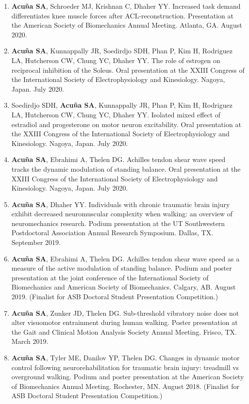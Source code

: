 \documentclass[letterpaper, 10pt]{article}
\begin{document}
\begin{enumerate}
    \item \textbf{Acuña SA}, Schroeder MJ, Krishnan C, Dhaher YY. Increased task demand differentiates knee muscle forces after ACL-reconstruction. Presentation at the American Society of Biomechanics Annual Meeting. Atlanta, GA. August 2020.
    \item \textbf{Acuña SA}, Kunnappally JR, Soedirdjo SDH, Phan P, Kim H, Rodriguez LA, Hutcherson CW, Chung YC, Dhaher YY. The role of estrogen on reciprocal inhibition of the Soleus. Oral presentation at the XXIII Congress of the International Society of Electrophysiology and Kinesiology. Nagoya, Japan. July 2020.
    \item Soedirdjo SDH, \textbf{Acuña SA}, Kunnappally JR, Phan P, Kim H, Rodriguez LA, Hutcherson CW, Chung YC, Dhaher YY. Isolated mixed effect of estradiol and progesterone on motor neuron excitability. Oral presentation at the XXIII Congress of the International Society of Electrophysiology and Kinesiology. Nagoya, Japan. July 2020.
    \item \textbf{Acuña SA}, Ebrahimi A, Thelen DG. Achilles tendon shear wave speed tracks the dynamic modulation of standing balance. Oral presentation at the XXIII Congress of the International Society of Electrophysiology and Kinesiology. Nagoya, Japan. July 2020.
    \item \textbf{Acuña SA}, Dhaher YY. Individuals with chronic traumatic brain injury exhibit decreased neuromuscular complexity when walking: an overview of neuromechanics research. Podium presentation at the UT Southwestern Postdoctoral Association Annual Research Symposium. Dallas, TX. September 2019.
    \item \textbf{Acuña SA}, Ebrahimi A, Thelen DG. Achilles tendon shear wave speed as a measure of the active modulation of standing balance. Podium and poster presentation at the joint conference of the International Society of Biomechanics and American Society of Biomechanics. Calgary, AB. August 2019. (Finalist for ASB Doctoral Student Presentation Competition.)
    \item \textbf{Acuña SA}, Zunker JD, Thelen DG. Sub-threshold vibratory noise does not alter visuomotor entrainment during human walking. Poster presentation at the Gait and Clinical Motion Analysis Society Annual Meeting. Frisco, TX. March 2019.
    \item \textbf{Acuña SA}, Tyler ME, Danilov YP, Thelen DG. Changes in dynamic motor control following neurorehabilitation for traumatic brain injury: treadmill vs overground walking. Podium and poster presentation at the American Society of Biomechanics Annual Meeting. Rochester, MN. August 2018. (Finalist for ASB Doctoral Student Presentation Competition.)

\end{enumerate}
\end{document}
